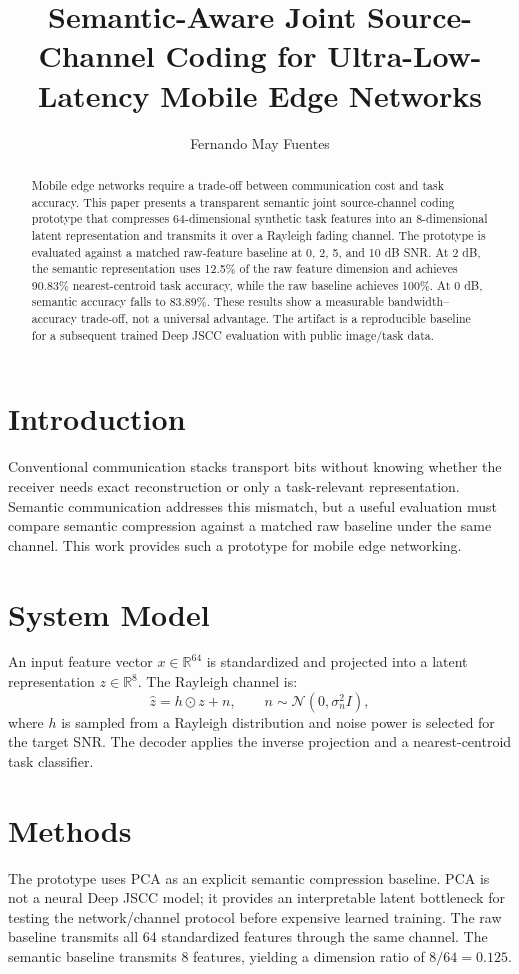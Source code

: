\documentclass[sigconf]{acmart}
\title{Semantic-Aware Joint Source-Channel Coding for Ultra-Low-Latency Mobile Edge Networks}
\author{Fernando May Fuentes}
\affiliation{\institution{Instituto Politecnico Nacional, UPIITA}\city{Mexico City}\country{Mexico}}
\affiliation{\institution{Beihang University, School of Information and Communication Engineering}\city{Beijing}\country{China}}
\begin{document}
\begin{abstract}
Mobile edge networks require a trade-off between communication cost and task accuracy. This paper presents a transparent semantic joint source-channel coding prototype that compresses 64-dimensional synthetic task features into an 8-dimensional latent representation and transmits it over a Rayleigh fading channel. The prototype is evaluated against a matched raw-feature baseline at 0, 2, 5, and 10 dB SNR. At 2 dB, the semantic representation uses 12.5\% of the raw feature dimension and achieves 90.83\% nearest-centroid task accuracy, while the raw baseline achieves 100\%. At 0 dB, semantic accuracy falls to 83.89\%. These results show a measurable bandwidth--accuracy trade-off, not a universal advantage. The artifact is a reproducible baseline for a subsequent trained Deep JSCC evaluation with public image/task data.
\end{abstract}
\maketitle

\section{Introduction}
Conventional communication stacks transport bits without knowing whether the receiver needs exact reconstruction or only a task-relevant representation. Semantic communication addresses this mismatch, but a useful evaluation must compare semantic compression against a matched raw baseline under the same channel. This work provides such a prototype for mobile edge networking.

\section{System Model}
An input feature vector $x\in\mathbb{R}^{64}$ is standardized and projected into a latent representation $z\in\mathbb{R}^{8}$. The Rayleigh channel is:
\begin{equation}
\hat z=h\odot z+n,\qquad n\sim\mathcal{N}(0,\sigma_n^2 I),
\end{equation}
where $h$ is sampled from a Rayleigh distribution and noise power is selected for the target SNR. The decoder applies the inverse projection and a nearest-centroid task classifier.

\section{Methods}
The prototype uses PCA as an explicit semantic compression baseline. PCA is not a neural Deep JSCC model; it provides an interpretable latent bottleneck for testing the network/channel protocol before expensive learned training. The raw baseline transmits all 64 standardized features through the same channel. The semantic baseline transmits 8 features, yielding a dimension ratio of $8/64=0.125$.
\end{document}

